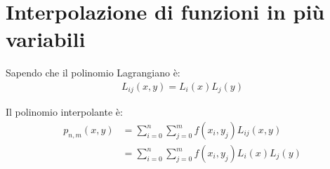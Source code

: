 \section{Interpolazione di funzioni in pi\`u variabili}
Sapendo che il polinomio Lagrangiano \`e:
\begin{align}
  L_{ij}(x, y) = L_i(x) L_j(y)
\end{align}

Il polinomio interpolante \`e:
\begin{align}
  p_{n, m}(x, y) &= \sum_{i=0}^n \sum_{j=0}^m f(x_i, y_j) L_{ij}(x, y) \\
  &= \sum_{i=0}^n \sum_{j=0}^m f(x_i, y_j) L_i(x) L_j(y)
\end{align}
